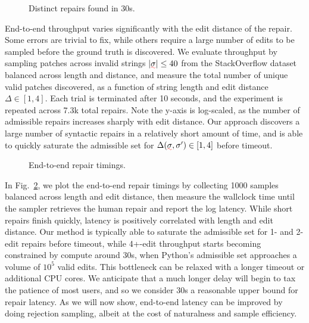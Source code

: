 \documentclass[sigplan,acmsmall,nonacm,screen]{acmart}\settopmatter{printfolios=false,printccs=false,printacmref=false}
\begin{document}
  \begin{figure}
    \vspace{-0.4cm}
    \resizebox{.35\textwidth}{!}{}
    \caption{Distinct repairs found in 30s.}
    \label{fig:throughput}
    \vspace{-0.4cm}
  \end{figure}

  End-to-end throughput varies significantly with the edit distance of the repair. Some errors are trivial to fix, while others require a large number of edits to be sampled before the ground truth is discovered. We evaluate throughput by sampling patches across invalid strings $|\err\sigma| \leq 40$ from the StackOverflow dataset balanced across length and distance, and measure the total number of unique valid patches discovered, as a function of string length and edit distance $\Delta\in[1, 4]$. Each trial is terminated after 10 seconds, and the experiment is repeated across 7.3k total repairs. Note the y-axis is log-scaled, as the number of admissible repairs increases sharply with edit distance. Our approach discovers a large number of syntactic repairs in a relatively short amount of time, and is able to quickly saturate the admissible set for $\Delta(\err\sigma, \sigma') \in [1, 4]$ before timeout.

  \begin{figure}
    \vspace{-0.4cm}
    \resizebox{.35\textwidth}{!}{}
    \caption{End-to-end repair timings.}
    \label{fig:timings}
    \vspace{-0.4cm}
  \end{figure}

  In Fig.~\ref{fig:timings}, we plot the end-to-end repair timings by collecting 1000 samples balanced across length and edit distance, then measure the wallclock time until the sampler retrieves the human repair and report the log latency. While short repairs finish quickly, latency is positively correlated with length and edit distance. Our method is typically able to saturate the admissible set for 1- and 2-edit repairs before timeout, while 4+-edit throughput starts becoming constrained by compute around 30s, when Python's admissible set approaches a volume of $10^5$ valid edits. This bottleneck can be relaxed with a longer timeout or additional CPU cores. We anticipate that a much longer delay will begin to tax the patience of most users, and so we consider 30s a reasonable upper bound for repair latency. As we will now show, end-to-end latency can be improved by doing rejection sampling, albeit at the cost of naturalness and sample efficiency.
\end{document}

